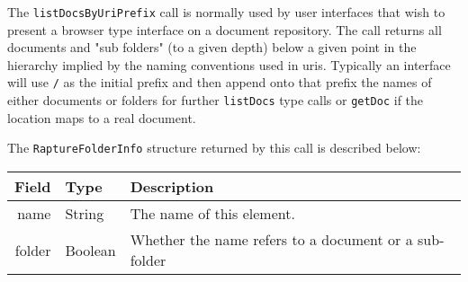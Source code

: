 The \verb+listDocsByUriPrefix+ call is normally used by user interfaces that wish
to present a browser type interface on a document repository. The call returns all documents
and "sub folders" (to a given depth) below a given point in the hierarchy implied
by the naming conventions used in uris. Typically an interface will use \verb+/+ as
the initial prefix and then append onto that prefix the names of either documents
or folders for further \verb+listDocs+ type calls or \verb+getDoc+ if the location
maps to a real document.

The \verb+RaptureFolderInfo+ structure returned by this call is described below:

\begin{table}[H]
  \small
\begin{center}
\begin{tabular}{r l p{8cm}}
  Field & Type & Description \\
  \hline
  name & String & The name of this element. \\
  folder & Boolean & Whether the name refers to a document or a sub-folder \\
\end{tabular}
\end{center}
\end{table}
